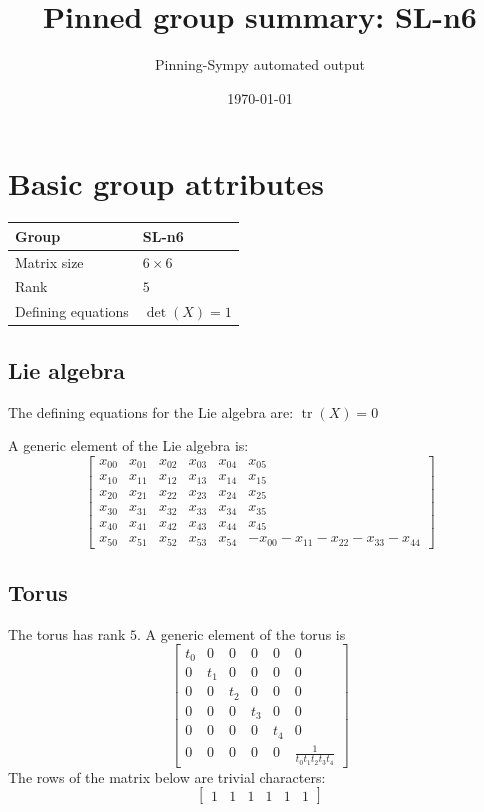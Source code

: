 \documentclass[11pt]{article}
\title{Pinned group summary: SL-n6}
\author{Pinning-Sympy automated output}
\date{\today}
\newcommand{\noi}{\noindent}
\theoremstyle{definition}
\begin{document}
\maketitle
\tableofcontents

\newpage

\section{Basic group attributes}

\def\arraystretch{1.2}
\begin{tabular}{|l|l|}
	\hline
    Group & SL-n6 \\
	\hline
    Matrix size & $6 \times 6$ \\
	\hline
    Rank & $5$ \\
	\hline
	Defining equations & $\operatorname{det}(X)=1$ \\
	\hline
\end{tabular}
\def\arraystretch{1}



\subsection{Lie algebra}

The defining equations for the Lie algebra are: $\operatorname{tr}(X)=0$

\noi A generic element of the Lie algebra is:
\[
\left[\begin{matrix}x_{0 0} & x_{0 1} & x_{0 2} & x_{0 3} & x_{0 4} & x_{0 5}\\x_{1 0} & x_{1 1} & x_{1 2} & x_{1 3} & x_{1 4} & x_{1 5}\\x_{2 0} & x_{2 1} & x_{2 2} & x_{2 3} & x_{2 4} & x_{2 5}\\x_{3 0} & x_{3 1} & x_{3 2} & x_{3 3} & x_{3 4} & x_{3 5}\\x_{4 0} & x_{4 1} & x_{4 2} & x_{4 3} & x_{4 4} & x_{4 5}\\x_{5 0} & x_{5 1} & x_{5 2} & x_{5 3} & x_{5 4} & - x_{0 0} - x_{1 1} - x_{2 2} - x_{3 3} - x_{4 4}\end{matrix}\right]
\]

\subsection{Torus}

The torus has rank $5$. A generic element of the torus is
\[
\left[\begin{matrix}t_{0} & 0 & 0 & 0 & 0 & 0\\0 & t_{1} & 0 & 0 & 0 & 0\\0 & 0 & t_{2} & 0 & 0 & 0\\0 & 0 & 0 & t_{3} & 0 & 0\\0 & 0 & 0 & 0 & t_{4} & 0\\0 & 0 & 0 & 0 & 0 & \frac{1}{t_{0} t_{1} t_{2} t_{3} t_{4}}\end{matrix}\right]
\]
The rows of the matrix below are trivial characters:
\[
\left[\begin{matrix}1 & 1 & 1 & 1 & 1 & 1\end{matrix}\right]
\]
\end{document}
